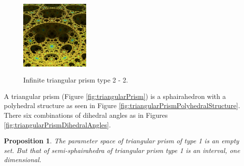 \documentclass[suppldata, dvipdfmx]{interact}
\theoremstyle{plain}%
\newtheorem{proposition}[theorem]{Proposition}
\theoremstyle{definition}
\theoremstyle{remark}
\theoremstyle{problemstyle}
\begin{document}
\begin{figure}[h!tbp]
\begin{minipage}{0.5\textwidth}
\begin{minipage}[t]{0.24\textwidth}
  \end{minipage}
  \hspace*{\fill}
  \begin{minipage}[t]{0.24\textwidth}
   \centering
   \includegraphics[width=1.35in, height=1.35in, keepaspectratio]{./img/sphairahedron/pentahedralPrism/limitsetInfType2_2.jpg}
   \label{fig:prismLimitInfType2_2}
  \end{minipage}
  \hspace*{\fill}
  \caption{Infinite triangular prism type 2 - 2.}
  \label{fig:prismInfType2_2}
 \end{minipage}
\end{figure}

A triangular prism (Figure \ref{fig:triangularPrism}) is a sphairahedron with a polyhedral structure as seen in Figure \ref{fig:triangularPrismPolyhedralStructure}.  There six combinations of dihedral angles as in Figures \ref{fig:triangularPrismDihedralAngles}.

\begin{proposition}\label{prop:paraSpace_TriangularPrism1}
The parameter space of triangular prism of type 1 is an empty set.  But that of semi-sphairahedra of triangular prism type 1 is an interval, one dimensional.
\end{proposition}
\end{document}
